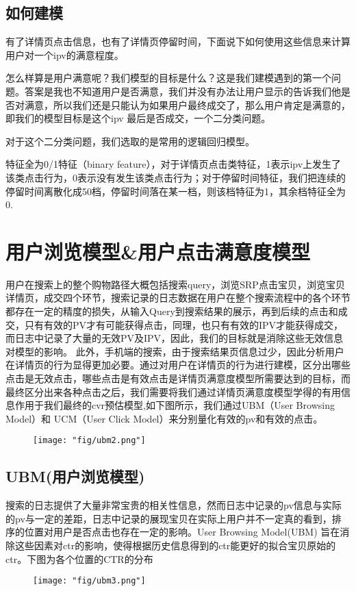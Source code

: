 \subsection{如何建模}
有了详情页点击信息，也有了详情页停留时间，下面说下如何使用这些信息来计算用户对一个ipv的满意程度。
\par 怎么样算是用户满意呢？我们模型的目标是什么？这是我们建模遇到的第一个问题。答案是我也不知道用户是否满意，我们并没有办法让用户显示的告诉我们他是否对满意，所以我们还是只能认为如果用户最终成交了，那么用户肯定是满意的，即我们的模型目标是这个ipv 最后是否成交，一个二分类问题。
\par 对于这个二分类问题，我们选取的是常用的逻辑回归模型。
\par 特征全为0/1特征（binary feature），对于详情页点击类特征，1表示ipv上发生了该类点击行为，0表示没有发生该类点击行为；对于停留时间特征，我们把连续的停留时间离散化成50档，停留时间落在某一档，则该档特征为1，其余档特征全为0.


\section{用户浏览模型\&用户点击满意度模型}  
用户在搜索上的整个购物路径大概包括搜索query，浏览SRP点击宝贝，浏览宝贝详情页，成交四个环节，搜索记录的日志数据在用户在整个搜索流程中的各个环节都存在一定的精度的损失，从输入Query到搜索结果的展示，再到后续的点击和成交，只有有效的PV才有可能获得点击，同理，也只有有效的IPV才能获得成交，而日志中记录了大量的无效PV及IPV，因此，我们的目标就是消除这些无效信息对模型的影响。
此外，手机端的搜索，由于搜索结果页信息过少，因此分析用户在详情页的行为显得更加必要。通过对用户在详情页的行为进行建模，区分出哪些点击是无效点击，哪些点击是有效点击是详情页满意度模型所需要达到的目标，而最终区分出来各种点击之后，我们需要将我们通过详情页满意度模型学得的有用信息作用于我们最终的cvr预估模型,如下图所示，我们通过UBM（User Browsing Model）和 UCM（User Click Model）来分别量化有效的pv和有效的点击。

\begin{figure}[!h]
	\centering
	\texttt{[image: "fig/ubm2.png"]}
	\caption{}
	\label{fig:ubm2}
\end{figure}


\subsection{UBM(用户浏览模型)}
搜索的日志提供了大量非常宝贵的相关性信息，然而日志中记录的pv信息与实际的pv与一定的差距，日志中记录的展现宝贝在实际上用户并不一定真的看到，排序的位置对用户是否点击也存在一定的影响。User Browsing Model(UBM) 旨在消除这些因素对ctr的影响，使得根据历史信息得到的ctr能更好的拟合宝贝原始的ctr。下图为各个位置的CTR的分布
\begin{figure}[!h]
	\centering
	\texttt{[image: "fig/ubm3.png"]}
	\caption{}
	\label{fig:ubm3}
\end{figure}

